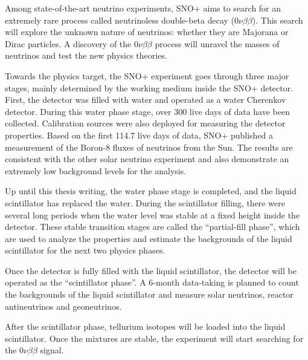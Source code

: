
Among state-of-the-art neutrino experiments, SNO+ aims to search for an extremely rare process called neutrinoless double-beta decay ($0\nu\beta\beta$). This search will explore the unknown nature of neutrinos: whether they are Majorana or Dirac particles. A discovery of the $0\nu\beta\beta$ process will unravel the masses of neutrinos and test the new physics theories.

Towards the physics target, the SNO+ experiment goes through three major stages, mainly determined by the working medium inside the SNO+ detector. First, the detector was filled with water and operated as a water Cherenkov detector. During this water phase stage, over 300 live days of data have been collected. Calibration sources were also deployed for measuring the detector properties. Based on the first 114.7 live days of data, SNO+ published a measurement of the Boron-8 fluxes of neutrinos from the Sun. The results are consistent with the other solar neutrino experiment and also demonstrate an extremely low background levels for the analysis\cite{anderson2019measurement}.

Up until this thesis writing, the water phase stage is completed, and the liquid scintillator has replaced the water. During the scintillator filling, there were several long periods when the water level was stable at a fixed height inside the detector. These stable transition stages are called the ``partial-fill phase'', which are used to analyze the properties and estimate the backgrounds of the liquid scintillator for the next two physics phases.

Once the detector is fully filled with the liquid scintillator, the detector will be operated as the ``scintillator phase''. A 6-month data-taking is planned to count the backgrounds of the liquid scintillator and measure solar neutrinos, reactor antineutrinos and geoneutrinos\cite{directorReview}. 

After the scintillator phase, tellurium isotopes will be loaded into the liquid scintillator. Once the mixtures are stable, the experiment will start searching for the $0\nu\beta\beta$ signal.

